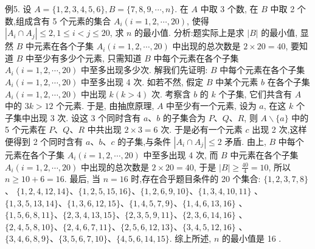 例5. 设 $A=\{1,2,3,4,5,6\}, B=\{7,8,9, \cdots, n\}$. 在 $A$ 中取 3 个数, 在 $B$ 中取 2 个数,组成含有 5 个元素的集合 $A_i(i=1,2, \cdots, 20)$, 使得 $\left|A_i \cap A_j\right| \leqslant 2,1 \leqslant i<j \leqslant 20$, 求 $n$ 的最小值.
分析:题实际上是求 $|B|$ 的最小值, 显然 $B$ 中元素在各个子集 $A_i(i=1,2, \cdots, 20)$ 中出现的总次数是 $2 \times 20=40$, 要知道 $B$ 中至少有多少个元素, 只需知道 $B$ 中每个元素在各个子集 $A_i(i=1,2, \cdots, 20)$ 中至多出现多少次.
解我们先证明: $B$ 中每个元素在各个子集 $A_i(i=1,2, \cdots, 20)$ 中至多出现 4 次.
如若不然, 假定 $B$ 中某个元素 $b$ 在各个子集 $A_i(i=1,2, \cdots, 20)$ 中出现 $k(k>4)$ 次.
考察含 $b$ 的 $k$ 个子集, 它们共含有 $A$ 中的 $3 k>12$ 个元素.
于是, 由抽庶原理, $A$ 中至少有一个元素, 设为 $a$, 在这 $k$ 个子集中出现 3 次.
设这 3 个同时含有 $a 、 b$ 的子集合为 $P 、 Q 、 R$, 则 $A \backslash\{a\}$ 中的 5 个元素在 $P 、 Q 、R$ 中共出现 $2 \times 3=6$ 次.
于是必有一个元素 $c$ 出现 2 次,这样便得到 2 个同时含有 $a 、 b 、 c$ 的子集,与条件 $\left|A_i \cap A_j\right| \leqslant 2$ 矛盾.
由上, $B$ 中每个元素在各个子集 $A_i(i=1,2, \cdots, 20)$ 中至多出现 4 次, 而 $B$ 中元素在各个子集 $A_i(i=1,2, \cdots, 20)$ 中出现的总次数是 $2 \times 20=40$, 于是 $|B| \geqslant \frac{40}{4}=10$, 所以 $n \geqslant 10+6=16$.
最后, 当 $n=16$ 时,存在合乎题目条件的 20 个集合: $\{1,2,3,7,8\}$ 、 $\{1,2,4,12,14\} 、\{1,2,5,15,16\} 、\{1,2,6,9,10\} 、\{1,3,4,10,11\}$ 、 $\{1,3,5,13,14\} 、\{1,3,6,12,15\} 、\{1,4,5,7,9\} 、\{1,4,6,13,16\}$ 、 $\{1,5,6,8,11\} 、\{2,3,4,13,15\} 、\{2,3,5,9,11\} 、\{2,3,6,14,16\}$ 、 $\{2,4,5,8,10\} 、\{2,4,6,7,11\} 、\{2,5,6,12,13\} 、\{3,4,5,12,16\}$ 、 $\{3,4,6,8,9\} 、\{3,5,6,7,10\} 、\{4,5,6,14,15\}$.
综上所述, $n$ 的最小值是 16 .



